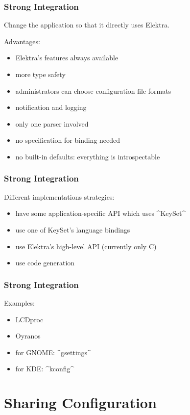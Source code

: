 \begin{frame}[fragile]
	\frametitle{Strong Integration}

	Change the application so that it directly uses Elektra.

	Advantages:
	\begin{itemize}[<+-| alert@+>]
	\item Elektra's features always available
	\item more type safety
	\item administrators can choose configuration file formats
	\item notification and logging
	\item only one parser involved
	\item no specification for binding needed
	\item no built-in defaults: everything is introspectable
	\end{itemize}
\end{frame}

\begin{frame}[fragile]
	\frametitle{Strong Integration}

	Different implementations strategies:

	\begin{itemize}[<+-| alert@+>]
	\item have some application-specific API which uses ^KeySet^
	\item use one of KeySet's language bindings
	\item use Elektra's high-level API (currently only C)
	\item use code generation
	\end{itemize}
\end{frame}

\begin{frame}[fragile]
	\frametitle{Strong Integration}
	Examples:
	\begin{itemize}
	\item LCDproc
	\item Oyranos
	\item for GNOME: ^gsettings^
	\item for KDE: ^kconfig^
	\end{itemize}
\end{frame}



\section{Sharing Configuration}

